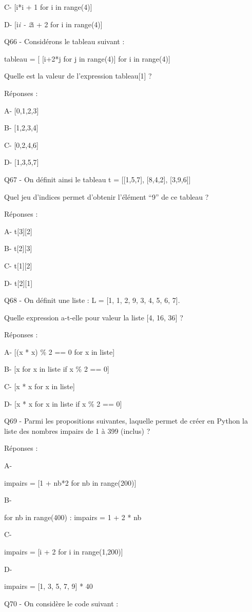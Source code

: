 \documentclass[
]{book}
\begin{document}
C- {[}i*i + 1 for i in range(4){]}

D- {[}i\emph{i - 2}i + 2 for i in range(4){]}

Q66 - Considérons le tableau suivant :

tableau = {[} {[}i+2*j for j in range(4){]} for i in range(4){]}

Quelle est la valeur de l'expression tableau{[}1{]} ?

Réponses :

A- {[}0,1,2,3{]}

B- {[}1,2,3,4{]}

C- {[}0,2,4,6{]}

D- {[}1,3,5,7{]}

Q67 - On définit ainsi le tableau t = {[}{[}1,5,7{]}, {[}8,4,2{]}, {[}3,9,6{]}{]}

Quel jeu d'indices permet d'obtenir l'élément ``9'' de ce tableau ?

Réponses :

A- t{[}3{]}{[}2{]}

B- t{[}2{]}{[}3{]}

C- t{[}1{]}{[}2{]}

D- t{[}2{]}{[}1{]}

Q68 - On définit une liste : L = {[}1, 1, 2, 9, 3, 4, 5, 6, 7{]}.

Quelle expression a-t-elle pour valeur la liste {[}4, 16, 36{]} ?

Réponses :

A- {[}(x * x) \% 2 == 0 for x in liste{]}

B- {[}x for x in liste if x \% 2 == 0{]}

C- {[}x * x for x in liste{]}

D- {[}x * x for x in liste if x \% 2 == 0{]}

Q69 - Parmi les propositions suivantes, laquelle permet de créer en Python la liste des nombres impairs de 1 à 399 (inclus) ?

Réponses :

A-

impairs = {[}1 + nb*2 for nb in range(200){]}

B-

for nb in range(400) :
impairs = 1 + 2 * nb

C-

impairs = {[}i + 2 for i in range(1,200){]}

D-

impairs = {[}1, 3, 5, 7, 9{]} * 40

Q70 - On considère le code suivant :
\end{document}
